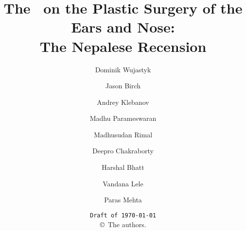 \documentclass[12pt]{article} %
\title{The \SS\ on the Plastic Surgery of the Ears and Nose:\\ The Nepalese 
Recension}
\author{Dominik Wujastyk \and
Jason Birch \and
Andrey Klebanov \and  
Madhu Parameswaran \and 
Madhusudan Rimal \and  
Deepro Chakraborty \and 
Harshal Bhatt \and  
Vandana Lele \and
Paras Mehta}
\date{\texttt{Draft of \today}\\ \copyright\     The authors.}
\begin{document}
    
    
    \maketitle
 
%     
\tableofcontents

\newpage


     
     
     
    
     
     

%    

\newpage    
\listoftodos
    
\end{document}
